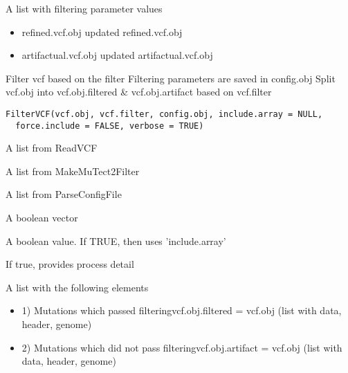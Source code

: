 \documentclass[letterpaper]{book}
\begin{document}
%
\begin{Value}
A list with filtering parameter values
\begin{itemize}

\item{} refined.vcf.obj updated refined.vcf.obj
\item{} artifactual.vcf.obj updated artifactual.vcf.obj

\end{itemize}

\end{Value}
%
\begin{Description}\relax
Filter vcf based on the filter
Filtering parameters are saved in config.obj
Split vcf.obj into vcf.obj.filtered \& vcf.obj.artifact based on vcf.filter
\end{Description}
%
\begin{Usage}
\begin{verbatim}
FilterVCF(vcf.obj, vcf.filter, config.obj, include.array = NULL,
  force.include = FALSE, verbose = TRUE)
\end{verbatim}
\end{Usage}
%
\begin{Arguments}
\begin{ldescription}
\item[\code{vcf.obj}] A list from ReadVCF

\item[\code{vcf.filter}] A list from MakeMuTect2Filter

\item[\code{config.obj}] A list from ParseConfigFile

\item[\code{include.array}] A boolean vector

\item[\code{force.include}] A boolean value. If TRUE, then uses 'include.array'

\item[\code{verbose}] If true, provides process detail
\end{ldescription}
\end{Arguments}
%
\begin{Value}
A list with the following elements
\begin{itemize}

\item{} 1) Mutations which passed filteringvcf.obj.filtered = vcf.obj (list with data, header, genome)
\item{} 2) Mutations which did not pass filteringvcf.obj.artifact = vcf.obj (list with data, header, genome)

\end{itemize}

\end{Value}
\end{document}
